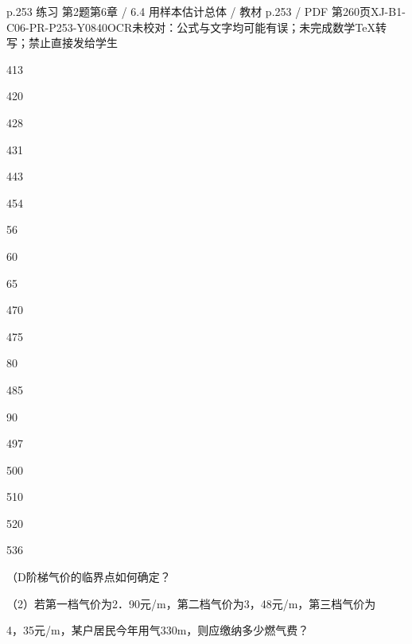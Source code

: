 \begin{bankitem}{p.253 练习 第2题}{第6章 / 6.4 用样本估计总体 / 教材 p.253 / PDF 第260页}{XJ-B1-C06-PR-P253-Y0840}{OCR未校对：公式与文字均可能有误；未完成数学TeX转写；禁止直接发给学生}
\begin{ocrdraft}
\par
413
\par
420
\par
428
\par
431
\par
443
\par
454
\par
56
\par
60
\par
65
\par
470
\par
475
\par
80
\par
485
\par
90
\par
497
\par
500
\par
510
\par
520
\par
536
\par
（D阶梯气价的临界点如何确定？
\par
（2）若第一档气价为2．90元/m，第二档气价为3，48元/m，第三档气价为
\par
4，35元/m，某户居民今年用气330m，则应缴纳多少燃气费？
\end{ocrdraft}
\end{bankitem}
